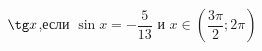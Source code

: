 \begin{ex}[type=calculate_expression]
	\begin{condition}
		\( \tg x \),\quad если \( \sin x=-\dfrac{5}{13} \) и \(  x\in\left( \dfrac{3\pi}{2};2\pi \right)\)
	\end{condition}
\end{ex}